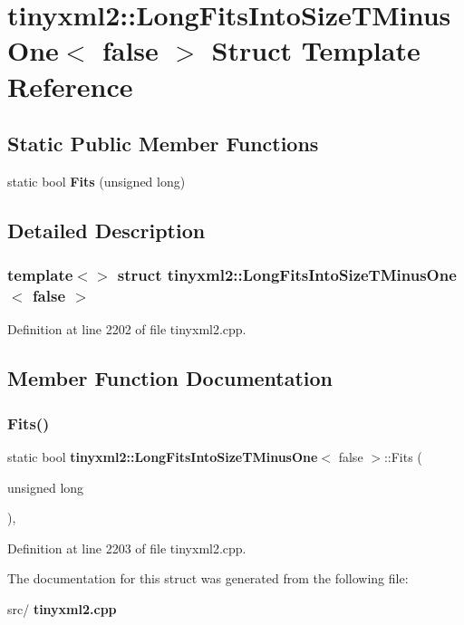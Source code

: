 \section{tinyxml2\+::Long\+Fits\+Into\+Size\+T\+Minus\+One$<$ false $>$ Struct Template Reference}
\label{structtinyxml2_1_1_long_fits_into_size_t_minus_one_3_01false_01_4}
\subsection*{Static Public Member Functions}
\begin{DoxyCompactItemize}
\item 
static bool \textbf{ Fits} (unsigned long)
\end{DoxyCompactItemize}


\subsection{Detailed Description}
\subsubsection*{template$<$$>$\newline
struct tinyxml2\+::\+Long\+Fits\+Into\+Size\+T\+Minus\+One$<$ false $>$}



Definition at line 2202 of file tinyxml2.\+cpp.



\subsection{Member Function Documentation}
\mbox{\label{structtinyxml2_1_1_long_fits_into_size_t_minus_one_3_01false_01_4_a29b01087f38a951276df69d358dc0764}} 
\subsubsection{Fits()}
{\footnotesize\ttfamily static bool \textbf{ tinyxml2\+::\+Long\+Fits\+Into\+Size\+T\+Minus\+One}$<$ false $>$\+::Fits (\begin{DoxyParamCaption}\item[{unsigned long}]{ }\end{DoxyParamCaption})\hspace{0.3cm}{\ttfamily [inline]}, {\ttfamily [static]}}



Definition at line 2203 of file tinyxml2.\+cpp.



The documentation for this struct was generated from the following file\+:\begin{DoxyCompactItemize}
\item 
src/\textbf{ tinyxml2.\+cpp}\end{DoxyCompactItemize}

